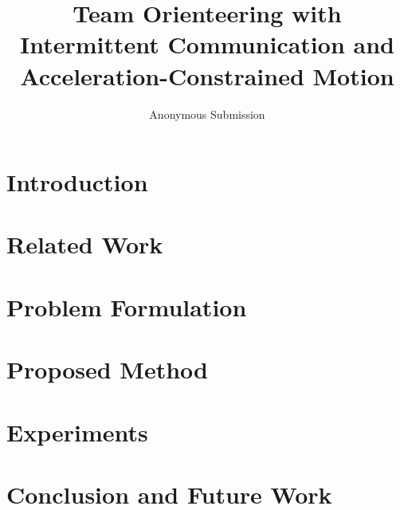\documentclass[letterpaper,10pt,conference]{ieeeconf}
\title{Team Orienteering with Intermittent Communication and Acceleration-Constrained Motion}
\author{Anonymous Submission}
\begin{document}
\maketitle
\thispagestyle{empty}
\pagestyle{empty}


\section{Introduction}\label{sec:introduction}

\section{Related Work}\label{sec:related}

\section{Problem Formulation}\label{sec:problem_formulation}

\section{Proposed Method}\label{sec:method}

\section{Experiments}\label{sec:experiments}

\section{Conclusion and Future Work}\label{sec:conclusion}




\end{document}
